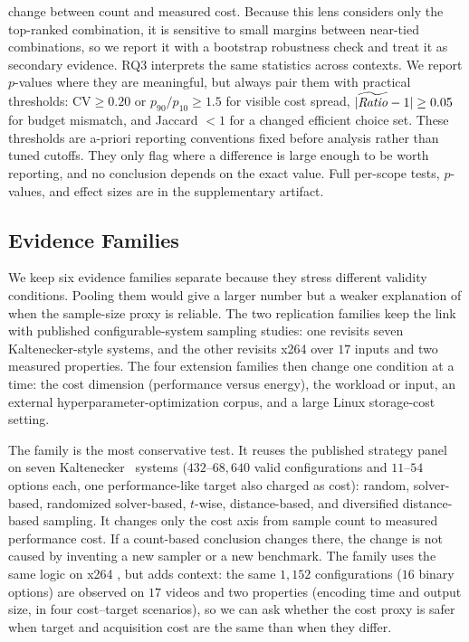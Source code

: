 change between count and measured cost. Because this lens considers only the
top-ranked combination, it is sensitive to small margins between near-tied
combinations, so we report it with a bootstrap robustness check and treat it as
secondary evidence. RQ3 interprets the same
statistics across contexts. We report $p$-values where they are meaningful, but
always pair them with practical thresholds: CV$\ge0.20$ or
$p_{90}/p_{10}\ge1.5$ for visible cost spread,
$|\widetilde{\mathit{Ratio}}-1|\ge0.05$ for budget mismatch, and Jaccard $<1$ for a
changed efficient choice set. These thresholds are a-priori reporting
conventions fixed before analysis rather than tuned cutoffs. They only flag
where a difference is large enough to be worth reporting, and no conclusion
depends on the exact value. Full per-scope tests, $p$-values, and effect
sizes are in the supplementary artifact.

\subsection{Evidence Families}
\label{subsec:families}

We keep six evidence families separate because they stress different validity
conditions. Pooling them would give a larger number but a weaker explanation of
when the sample-size proxy is reliable. The two replication families keep the
link with published configurable-system sampling studies: one revisits seven
Kaltenecker-style systems, and the other revisits x264 over $17$ inputs and two
measured properties. The four extension families then change one condition at a
time: the cost dimension (performance versus energy), the workload or input, an
external hyperparameter-optimization corpus, and a large Linux storage-cost
setting.

The \StudyReplicationICSE family is the most conservative test. It reuses the
published strategy panel on seven Kaltenecker \etal\ systems
\cite{kaltenecker2019} ($432$--$68{,}640$ valid configurations and $11$--$54$
options each, one performance-like target also charged as cost): random,
solver-based, randomized solver-based, $t$-wise, distance-based, and diversified
distance-based sampling. It changes only the cost axis from sample count to
measured performance cost. If a count-based conclusion changes there, the change
is not caused by inventing a new sampler or a new benchmark. The
\StudyReplicationICPE family uses the same logic on x264 \cite{pereira2020}, but
adds context: the same $1{,}152$ configurations ($16$ binary options) are
observed on $17$ videos and two properties (encoding time and output size, in
four cost--target scenarios), so we can ask whether the cost proxy is safer when
target and acquisition cost are the same than when they differ.

